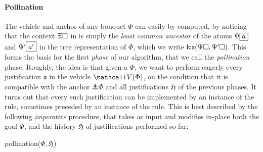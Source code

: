 \paragraph{Pollination}

The vehicle and anchor of any bouquet $\Phi$ can easily by computed, by noticing
that the context $\Xi\square$ in  is simply the \emph{least
common ancestor} of the atoms $\Psi\fbox{$a$}$ and $\Psi'\fbox{$a'$}$ in the
tree representation of $\Phi$, which we write $\mathsf{lca}(\Psi\square,\Psi'\square)$.
This forms the basis for the first \emph{phase} of our algorithm, that we call
the \emph{pollination} phase. Roughly, the idea
is that given a  $\Phi$, we want to perform eagerly every justification
$\mathfrak{a}$ in the vehicle $\vehicle{\Phi}$, on the condition that it is
compatible with the anchor $\anchor{\Phi}$ and all justifications $\mathfrak{H}$
of the previous phases. It turns out that every such justification can be
implemented by an instance of the  rule, sometimes preceded by an
instance of the  rule. This is best described by the following
\emph{imperative} procedure, that takes as input and modifies in-place both the
goal $\Phi$, and the history $\mathfrak{H}$ of justifications performed so far:

\DontPrintSemicolon

\begin{procedure}[H]
  \caption{pollination($\Phi, \mathfrak{H}$)}
  \BlankLine

\end{procedure}

